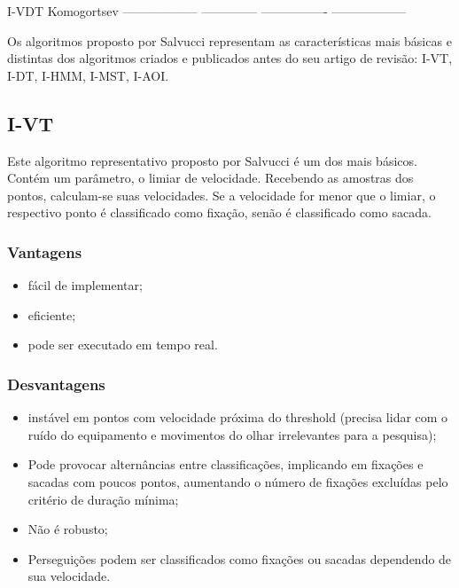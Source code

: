 I-VDT Komogortsev ------------------ -------------- ----------------
------------------

Os algoritmos proposto por Salvucci representam as características mais
básicas e distintas dos algoritmos criados e publicados antes do seu
artigo de revisão: I-VT, I-DT, I-HMM, I-MST, I-AOI.

\subsection{I-VT}\label{i-vt}

Este algoritmo representativo proposto por Salvucci é um dos mais
básicos. Contém um parâmetro, o limiar de velocidade. Recebendo as
amostras dos pontos, calculam-se suas velocidades. Se a velocidade for
menor que o limiar, o respectivo ponto é classificado como fixação,
senão é classificado como sacada.

\subsubsection{Vantagens}\label{vantagens}

\begin{itemize}
\itemsep1pt\parskip0pt
\item
  fácil de implementar;
\item
  eficiente;
\item
  pode ser executado em tempo real.
\end{itemize}

\subsubsection{Desvantagens}\label{desvantagens}

\begin{itemize}
\itemsep1pt\parskip0pt
\item
  instável em pontos com velocidade próxima do threshold (precisa lidar
  com o ruído do equipamento e movimentos do olhar irrelevantes para a
  pesquisa);
\item
  Pode provocar alternâncias entre classificações, implicando em
  fixações e sacadas com poucos pontos, aumentando o número de fixações
  excluídas pelo critério de duração mínima;
\item
  Não é robusto;
\item
  Perseguições podem ser classificados como fixações ou sacadas
  dependendo de sua velocidade.
\end{itemize}

